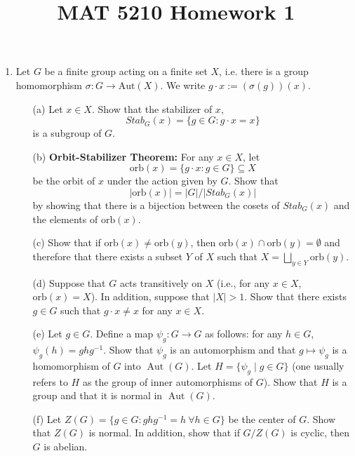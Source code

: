 \documentclass{article}
\title{MAT 5210 Homework 1}
\author{}
\date{}
\begin{document}
\maketitle
\begin{enumerate}
    \item Let $G$ be a finite group acting on a finite set $X$, i.e. there is a group homomorphism $\sigma: G \to \mathrm{Aut}(X)$. We write $g \cdot x := (\sigma(g))(x)$.

\begin{enumerate}
    \item[(a)] Let $x \in X$. Show that the stabilizer of $x$,
    \[
    Stab_G(x) = \{ g \in G : g\cdot x = x \}
    \]
    is a subgroup of $G$.

    \item[(b)] \textbf{Orbit-Stabilizer Theorem:} For any $x \in X$, let 
    $$\mathrm{orb}(x) = \{ g\cdot x : g \in G \} \subseteq X$$ 
    be the orbit of $x$ under the action given by $G$. Show that $$|\mathrm{orb}(x)| = |G| / |Stab_G(x)|$$ 
    by showing that there is a bijection between the cosets of $Stab_G(x)$ and the elements of $\mathrm{orb}(x)$.

    \item[(c)] Show that if $\mathrm{orb}(x) \neq \mathrm{orb}(y)$, then $\mathrm{orb}(x) \cap \mathrm{orb}(y) = \emptyset$ and therefore that there exists a subset $Y$ of $X$ such that $X = \bigsqcup_{y \in Y} \mathrm{orb}(y)$.

    \item[(d)] Suppose that $G$ acts transitively on $X$ (i.e., for any $x \in X$, $\mathrm{orb}(x) = X$). In addition, suppose that $|X| > 1$. Show that there exists $g \in G$ such that $g \cdot x \neq x$ for any $x \in X$.

    \item[(e)] Let $g \in G$. Define a map $\psi_g : G \to G$ as follows: for any $h \in G$, $\psi_g(h) = ghg^{-1}$. Show that $\psi_g$ is an automorphism and that $g \mapsto \psi_g$ is a homomorphism of $G$ into $\operatorname{Aut}(G)$. Let $H = \{ \psi_g \mid g \in G \}$ (one usually refers to $H$ as the group of inner automorphisms of $G$). Show that $H$ is a group and that it is normal in $\operatorname{Aut}(G)$.

    \item[(f)] Let $Z(G) = \{ g \in G : ghg^{-1} = h \ \forall h \in G \}$ be the center of $G$. Show that $Z(G)$ is normal. In addition, show that if $G / Z(G)$ is cyclic, then $G$ is abelian.


\end{enumerate}
\end{enumerate}
\end{document}
